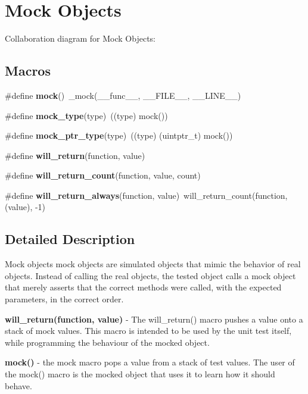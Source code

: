 \hypertarget{group__cmocka__mock}{}\section{Mock Objects}
\label{group__cmocka__mock}
Collaboration diagram for Mock Objects\+:
\subsection*{Macros}
\begin{DoxyCompactItemize}
\item 
\mbox{\label{group__cmocka__mock_gabfbc7d47a880b629f1f922c84bb0b298}} 
\#define {\bfseries mock}()~\+\_\+mock(\+\_\+\+\_\+func\+\_\+\+\_\+, \+\_\+\+\_\+\+F\+I\+L\+E\+\_\+\+\_\+, \+\_\+\+\_\+\+L\+I\+N\+E\+\_\+\+\_\+)
\item 
\mbox{\label{group__cmocka__mock_ga9c5b6d6f0cb3f2020dfa9def4dbab594}} 
\#define {\bfseries mock\+\_\+type}(type)~((type) mock())
\item 
\mbox{\label{group__cmocka__mock_gad5d3d911b6b35fd12197d0866b69680d}} 
\#define {\bfseries mock\+\_\+ptr\+\_\+type}(type)~((type) (uintptr\+\_\+t) mock())
\item 
\#define {\bfseries will\+\_\+return}(function,  value)
\item 
\#define {\bfseries will\+\_\+return\+\_\+count}(function,  value,  count)
\item 
\mbox{\label{group__cmocka__mock_gaa71fcfa99426230c1b17b135a2690630}} 
\#define {\bfseries will\+\_\+return\+\_\+always}(function,  value)~will\+\_\+return\+\_\+count(function, (value), -\/1)
\end{DoxyCompactItemize}


\subsection{Detailed Description}
Mock objects mock objects are simulated objects that mimic the behavior of real objects. Instead of calling the real objects, the tested object calls a mock object that merely asserts that the correct methods were called, with the expected parameters, in the correct order.


\begin{DoxyItemize}
\item {\bfseries will\+\_\+return(function, value)} -\/ The will\+\_\+return() macro pushes a value onto a stack of mock values. This macro is intended to be used by the unit test itself, while programming the behaviour of the mocked object.


\item {\bfseries mock()} -\/ the mock macro pops a value from a stack of test values. The user of the mock() macro is the mocked object that uses it to learn how it should behave. 
\end{DoxyItemize}

